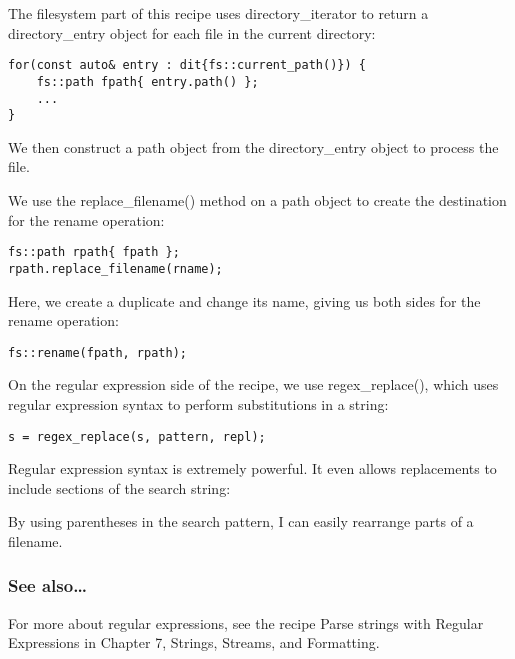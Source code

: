 The filesystem part of this recipe uses directory\_iterator to return a directory\_entry object for each file in the current directory:

\begin{lstlisting}[style=styleCXX]
for(const auto& entry : dit{fs::current_path()}) {
	fs::path fpath{ entry.path() };
	...
}
\end{lstlisting}

We then construct a path object from the directory\_entry object to process the file.

We use the replace\_filename() method on a path object to create the destination for the rename operation:

\begin{lstlisting}[style=styleCXX]
fs::path rpath{ fpath };
rpath.replace_filename(rname);
\end{lstlisting}

Here, we create a duplicate and change its name, giving us both sides for the rename operation:

\begin{lstlisting}[style=styleCXX]
fs::rename(fpath, rpath);
\end{lstlisting}

On the regular expression side of the recipe, we use regex\_replace(), which uses regular expression syntax to perform substitutions in a string:

\begin{lstlisting}[style=styleCXX]
s = regex_replace(s, pattern, repl);
\end{lstlisting}

Regular expression syntax is extremely powerful. It even allows replacements to include sections of the search string:


By using parentheses in the search pattern, I can easily rearrange parts of a filename.

\subsubsection{See also…}

For more about regular expressions, see the recipe Parse strings with Regular Expressions in Chapter 7, Strings, Streams, and Formatting.


